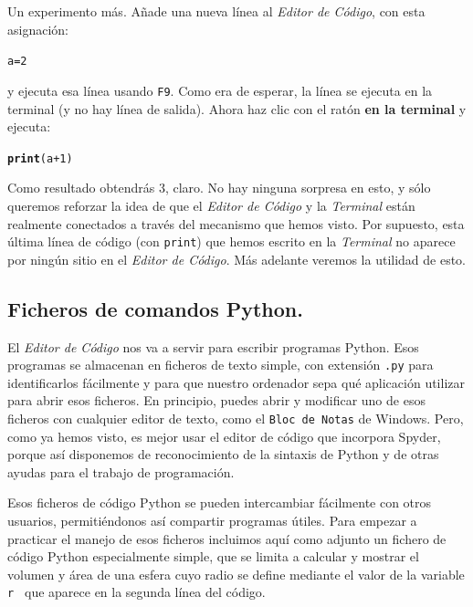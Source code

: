 \documentclass[10pt,a4paper]{article}\usepackage[]{graphicx}\usepackage[]{color}
\makeatletter
\newcommand{\hlnum}[1]{\textcolor[rgb]{0.686,0.059,0.569}{#1}}%
\newcommand{\hlopt}[1]{\textcolor[rgb]{0,0,0}{#1}}%
\newcommand{\hlstd}[1]{\textcolor[rgb]{0.345,0.345,0.345}{#1}}%
\newcommand{\hlkwb}[1]{\textcolor[rgb]{0.69,0.353,0.396}{#1}}%
\newcommand{\hlkwd}[1]{\textcolor[rgb]{0.737,0.353,0.396}{\textbf{#1}}}%
\newenvironment{kframe}{%
 \def\at@end@of@kframe{}%
 \ifinner\ifhmode%
  \def\at@end@of@kframe{\end{minipage}}%
  \begin{minipage}{\columnwidth}%
 \fi\fi%
 \def\FrameCommand##1{\hskip\@totalleftmargin \hskip-\fboxsep
 \colorbox{shadecolor}{##1}\hskip-\fboxsep
     \hskip-\linewidth \hskip-\@totalleftmargin \hskip\columnwidth}%
 \MakeFramed {\advance\hsize-\width
   \@totalleftmargin\z@ \linewidth\hsize
   \@setminipage}}%
 {\par\unskip\endMakeFramed%
 \at@end@of@kframe}
\newenvironment{knitrout}{}{} %
\makeatother
\begin{document}
Un experimento más. Añade una nueva línea al {\em Editor de Código}, con esta asignación:
\begin{knitrout}
\color{fgcolor}\begin{kframe}
\begin{alltt}
\hlstd{a} \hlkwb{=} \hlnum{2}
\end{alltt}
\end{kframe}
\end{knitrout}
y ejecuta esa línea usando {\tt F9}. Como era de esperar, la línea se ejecuta en la terminal (y no hay línea de salida). Ahora haz clic con el ratón {\bf en la terminal} y ejecuta:
\begin{knitrout}
\color{fgcolor}\begin{kframe}
\begin{alltt}
\hlkwd{print}\hlstd{(a} \hlopt{+} \hlnum{1}\hlstd{)}
\end{alltt}
\end{kframe}
\end{knitrout}
Como resultado obtendrás 3, claro. No hay ninguna sorpresa en esto, y sólo queremos reforzar la idea de que el {\em Editor de Código} y la {\em Terminal} están realmente conectados a través del mecanismo que hemos visto. Por supuesto, esta última línea de código (con {\tt print}) que hemos escrito en la {\em Terminal} no aparece por ningún sitio en el {\em Editor de Código}. Más adelante veremos la utilidad de esto.

\subsection{Ficheros de comandos Python.}
\label{tut02:subsec:ficherosComandosPython}

El {\em Editor de Código} nos va a servir para escribir programas Python. Esos programas se almacenan en ficheros de texto simple, con extensión {\tt .py} para identificarlos fácilmente y para que nuestro ordenador sepa qué aplicación utilizar para abrir esos ficheros. En principio, puedes abrir y modificar uno de esos ficheros con cualquier editor de texto, como el {\tt Bloc de Notas} de Windows. Pero, como ya hemos visto, es mejor usar el editor de código que incorpora Spyder, porque así disponemos de reconocimiento de la sintaxis de Python y de otras ayudas para el trabajo de programación. 

Esos ficheros de código Python se pueden intercambiar fácilmente con otros usuarios, permitiéndonos así compartir programas útiles. Para empezar a practicar el manejo de esos ficheros incluimos aquí como adjunto un fichero de código Python especialmente simple, que se limita a calcular y mostrar el volumen y área de una esfera cuyo radio se define mediante el valor de la variable {\tt r } que aparece en la segunda línea del código.
\end{document}
